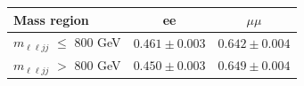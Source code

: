\begin{table}[htp]
  \label{tab:emu_tf_resolved_RunIII2024Summer24}
  \centering
  \begin{tabular}{l | c c}
    \hline
    Mass region & ee & $\mu\mu$ \\
    \hline
    $m_{\ell\ell jj}$ $\leq$ 800 GeV & $0.461 \pm 0.003$ & $0.642 \pm 0.004$ \\
    $m_{\ell\ell jj}$ $>$ 800 GeV & $0.450 \pm 0.003$ & $0.649 \pm 0.004$ \\
    \hline
  \end{tabular}
\end{table}
